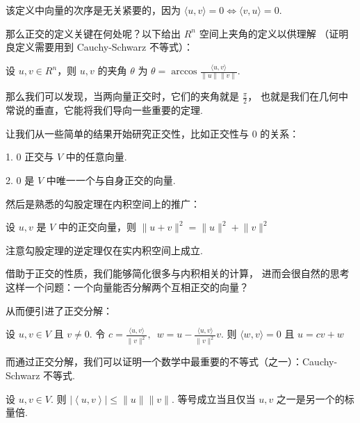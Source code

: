 该定义中向量的次序是无关紧要的，因为 $\langle u, v\rangle = 0 \Leftrightarrow \langle v, u\rangle = 0$. 

\vspace{2ex} 

那么正交的定义关键在何处呢？以下给出 $R^{n}$ 空间上夹角的定义以供理解
（证明良定义需要用到 Cauchy-Schwarz 不等式）：

\begin{definition}
    设 $u, v \in R^{n}$，则 $u, v$ 的夹角 $ \theta $ 为 
    $ \theta = \arccos \frac{\langle u, v\rangle}{\lVert u \rVert \lVert v \rVert}$.
\end{definition}

那么我们可以发现，当两向量正交时，它们的夹角就是 $\frac{\pi}{2}$，
也就是我们在几何中常说的垂直，它能将我们导向一些重要的定理. 

\vspace{2ex} 

让我们从一些简单的结果开始研究正交性，比如正交性与 0 的关系：

1. 0 正交与 $V$ 中的任意向量.

2. 0 是 $V$ 中唯一一个与自身正交的向量.

然后是熟悉的勾股定理在内积空间上的推广：

\begin{theorem}
    设 $u, v$ 是 $V$ 中的正交向量，则 $\lVert u + v \rVert^2 = \lVert u \rVert^2 + \lVert v \rVert^2 $ 
\end{theorem}

注意勾股定理的逆定理仅在实内积空间上成立. 

\vspace{2ex} 

借助于正交的性质，我们能够简化很多与内积相关的计算，
进而会很自然的思考这样一个问题：一个向量能否分解两个互相正交的向量？

从而便引进了正交分解：

\begin{theorem}
    设 $u, v \in V$ 且 $v \neq 0$. 令 $ c = \frac{\langle u, v\rangle}{\lVert v \rVert^2}, 
    \enspace w = u - \frac{\langle u, v\rangle}{\lVert v \rVert^2}v$. 则 $\langle w, v\rangle = 0$ 
    且 $u = cv + w$
\end{theorem}

而通过正交分解，我们可以证明一个数学中最重要的不等式（之一）：Cauchy-Schwarz 不等式. 

\begin{theorem}
    设 $u, v \in V$. 则 $\left\lvert \left\langle u, v\right\rangle \right\rvert \leqslant \lVert u \rVert\lVert v \rVert$. 
    等号成立当且仅当 $u, v$ 之一是另一个的标量倍.
\end{theorem}

